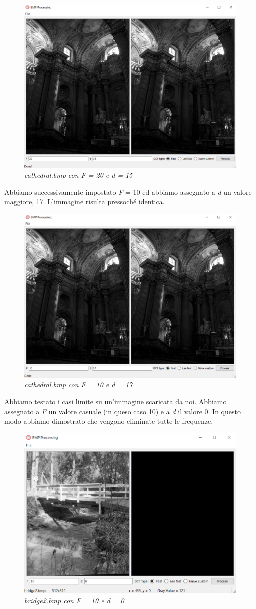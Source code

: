 \documentclass[a4paper,12pt]{report}
\begin{document}
\begin{figure}[H]
\centering
\includegraphics[width=0.6\linewidth]{../img/cathedral_20_15.png}
\caption{\textit{cathedral.bmp con F = 20 e d = 15}}
\end{figure}

\noindent Abbiamo successivamente impostato \textit{F} = 10 ed abbiamo assegnato a \textit{d} un valore maggiore, 17. L'immagine risulta pressoché identica.

\begin{figure}[H]
\centering
\includegraphics[width=0.6\linewidth]{../img/cathedral_10_17.png}
\caption{\textit{cathedral.bmp con F = 10 e d = 17}}
\end{figure}

\newpage

\noindent Abbiamo testato i casi limite su un'immagine scaricata da noi. Abbiamo assegnato a \textit{F} un valore casuale (in queso caso 10) e a \textit{d} il valore 0. In questo modo abbiamo dimostrato che vengono eliminate tutte le frequenze.

\begin{figure}[H]
\centering
\includegraphics[width=0.6\linewidth]{../img/bridge2_10_0.png}
\caption{\textit{bridge2.bmp con F = 10 e d = 0}}
\end{figure}
\end{document}
